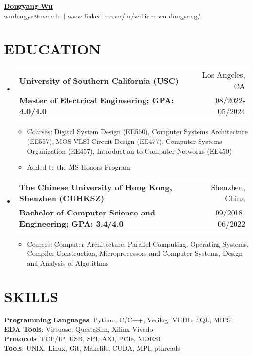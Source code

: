 \documentclass[letterpaper,11pt]{article}
\makeatletter
\newcommand{\resumeItemOne}[1]{
  \item\small{#1}
}
\newcommand{\resumeSubheading}[4]{
  \vspace{-1pt}\item
    \begin{tabular*}{0.97\textwidth}[t]{l@{\extracolsep{\fill}}r}
      \textbf{#1} & #2 \\
      \textbf{\small#3} & \small{#4} \\
    \end{tabular*}\vspace{-10pt}
}
\newcommand{\resumeSubHeadingListStart}{\begin{itemize}[leftmargin=*]}
\newcommand{\resumeSubHeadingListEnd}{\end{itemize}\vspace{-5pt}}
\newcommand{\resumeItemListStart}{\begin{itemize}}
\newcommand{\resumeItemListEnd}{\end{itemize}\vspace{-10pt}}
\makeatother
\begin{document}
\textbf{\href{https://www.linkedin.com/in/william-wu-dongyang/}{\LARGE {Dongyang Wu}}} \\
{
    \href{mailto:{wudongya@usc.edu}}{{wudongya@usc.edu}} $|$ \href{https://www.linkedin.com/in/william-wu-dongyang/}{www.linkedin.com/in/william-wu-dongyang/}
}\section{EDUCATION}
\resumeSubHeadingListStart
\resumeSubheading
    {University of Southern California (USC)}{Los Angeles, CA}
    {Master of Electrical Engineering; GPA: 4.0/4.0
}{08/2022-05/2024}
\resumeItemListStart
	\resumeItemOne{Courses: Digital System Design (EE560), Computer Systems Architecture (EE557), MOS VLSI Circuit Design (EE477), Computer Systems Organization (EE457), Introduction to Computer Networks (EE450)}
	\resumeItemOne{Added to the MS Honors Program}
\resumeItemListEnd
\resumeSubheading
    {The Chinese University of Hong Kong, Shenzhen (CUHKSZ)}{Shenzhen, China}
    {Bachelor of Computer Science and Engineering; GPA: 3.4/4.0
}{09/2018-06/2022}
\resumeItemListStart
	\resumeItemOne{Courses: Computer Architecture, Parallel Computing, Operating Systems, Compiler Construction, Microprocessors and Computer Systems, Design and Analysis of Algorithms}
\resumeItemListEnd
\resumeSubHeadingListEnd



\section{SKILLS}
\textbf{Programming Languages}: Python, C/C++, Verilog, VHDL, SQL, MIPS\\ 
\textbf{EDA Tools}: Virtuoso, QuestaSim, Xilinx Vivado\\ 
\textbf{Protocols}: TCP/IP, USB, SPI, AXI, PCIe, MOESI\\ 
\textbf{Tools}: UNIX, Linux, Git, Makefile, CUDA, MPI, pthreads\\ 
\end{document}

